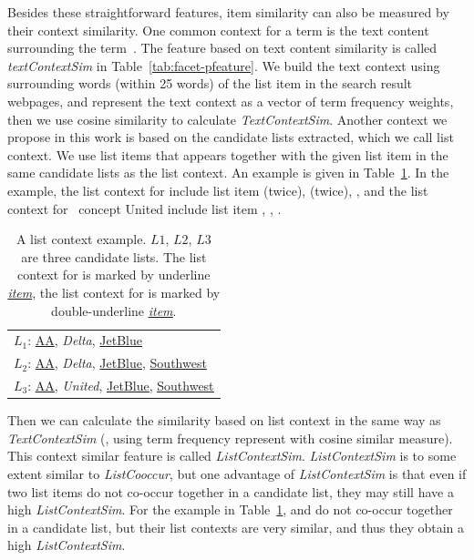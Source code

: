 Besides these straightforward features, item similarity can also be measured by their context similarity. One common context for a term is the text content surrounding the term~\cite{shi2010corpus}. The feature based on text content similarity is called \textit{textContextSim} in Table~\ref{tab:facet-pfeature}. We build the text context using surrounding words (within 25 words) of the list item in the search result webpages, and represent the text context as a vector of term frequency weights, then we use cosine similarity to calculate \textit{TextContextSim}. Another context we propose in this work is based on the candidate lists extracted, which we call list context. We use list items that appears together with the given list item in the same candidate lists as the list context. An example is given in Table~\ref{tab:facet-listcontext}. In the example, the list context for  include list item  (twice),  (twice), , and the list context for \
concept{
United} include list item , , . 
\begin{table}[ht!]
\centering
\caption{A list context example. $L1$, $L2$, $L3$ are three candidate lists. The list context for  is marked by underline \underline{\textit{item}}, the list context for  is marked by double-underline \underline{\underline{\textit{item}}}.}
\label{tab:facet-listcontext}
\begin{tabular}{|l|} \hline
$L_1$: \underline{AA}, \textit{Delta}, \underline{JetBlue} \\
$L_2$: \underline{AA}, \textit{Delta}, \underline{JetBlue},  \underline{Southwest}\\
$L_3$: \underline{\underline{AA}}, \textit{United}, \underline{\underline{JetBlue}}, \underline{\underline{Southwest}}\\ 
\hline
\end{tabular}
\end{table}
Then we can calculate the similarity based on list context in the same way as \textit{TextContextSim} (\ie, using term frequency represent with cosine similar measure). This context similar feature is called \textit{ListContextSim}. \textit{ListContextSim} is to some extent similar to \textit{ListCooccur}, but one advantage of \textit{ListContextSim} is that even if two list items do not co-occur together in a candidate list, they may still have a high \textit{ListContextSim}. For the example in Table~\ref{tab:facet-listcontext},  and  do not co-occur together in a candidate list, but their list contexts are very similar, and thus they obtain a high \textit{ListContextSim}.


